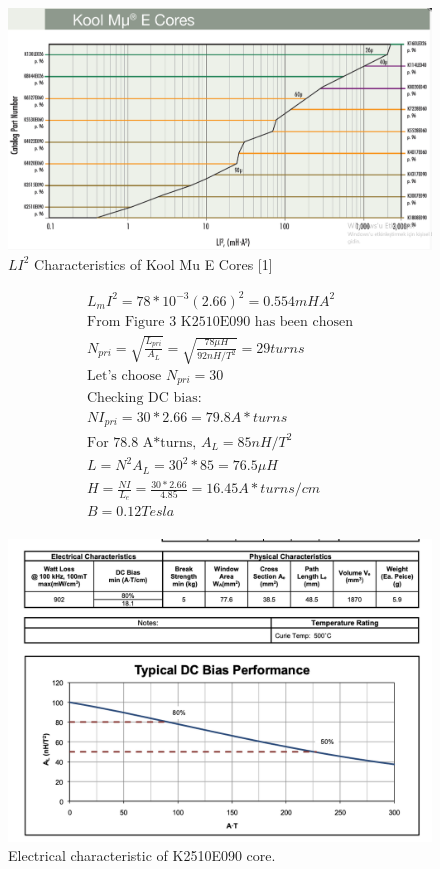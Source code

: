 \documentclass{article}
\begin{document}
\begin{figure}[H]
     \centering
     \includegraphics[scale=0.35]{f6.png}
     \caption{$LI^2$ Characteristics of Kool Mu E Cores [1]}
     \label{fig:my_label}
 \end{figure}
 
 \begin{gather*}
     L_mI^2=78*10^{-3}(2.66)^2=0.554mHA^2\\
     \text{From Figure 3 K2510E090 has been chosen}\\
     N_{pri}=\sqrt{\frac{L_{pri}}{A_L}}=\sqrt{\frac{78\mu H}{92nH/T^2}}=29turns\\
     \text{Let's choose $N_{pri}=30$}\\
     \text{Checking DC bias:}\\
     NI_{pri}=30*2.66=79.8A*turns\\
     \text{For 78.8 A*turns, $A_L=85 nH/T^2$}\\
     L=N^2A_L=30^2*85=76.5\mu H\\
     H=\frac{NI}{L_e}=\frac{30*2.66}{4.85}=16.45 A*turns/cm\\
     B=0.12 Tesla\\
 \end{gather*}
 
 \begin{figure}[H]
     \centering
     \includegraphics[scale=0.6]{CORE.png}
     \caption{Electrical characteristic of K2510E090 core.}
     \label{fig:my_label}
 \end{figure}
 
\end{document}
